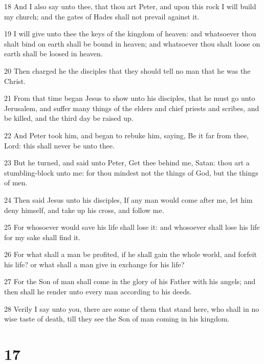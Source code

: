 \par 18 And I also say unto thee, that thou art Peter, and upon this rock I will build my church; and the gates of Hades shall not prevail against it.
\par 19 I will give unto thee the keys of the kingdom of heaven: and whatsoever thou shalt bind on earth shall be bound in heaven; and whatsoever thou shalt loose on earth shall be loosed in heaven.
\par 20 Then charged he the disciples that they should tell no man that he was the Christ.
\par 21 From that time began Jesus to show unto his disciples, that he must go unto Jerusalem, and suffer many things of the elders and chief priests and scribes, and be killed, and the third day be raised up.
\par 22 And Peter took him, and began to rebuke him, saying, Be it far from thee, Lord: this shall never be unto thee.
\par 23 But he turned, and said unto Peter, Get thee behind me, Satan: thou art a stumbling-block unto me: for thou mindest not the things of God, but the things of men.
\par 24 Then said Jesus unto his disciples, If any man would come after me, let him deny himself, and take up his cross, and follow me.
\par 25 For whosoever would save his life shall lose it: and whosoever shall lose his life for my sake shall find it.
\par 26 For what shall a man be profited, if he shall gain the whole world, and forfeit his life? or what shall a man give in exchange for his life?
\par 27 For the Son of man shall come in the glory of his Father with his angels; and then shall he render unto every man according to his deeds.
\par 28 Verily I say unto you, there are some of them that stand here, who shall in no wise taste of death, till they see the Son of man coming in his kingdom.

\chapter{17}

